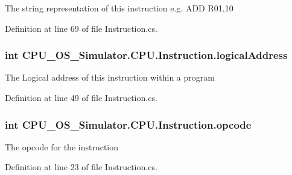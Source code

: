 The string representation of this instruction e.\+g. A\+D\+D R01,10 



Definition at line 69 of file Instruction.\+cs.

\hypertarget{class_c_p_u___o_s___simulator_1_1_c_p_u_1_1_instruction_a6577ac8b9582e24ec928bd4b59093960}{}
\subsubsection[{logical\+Address}]{\setlength{\rightskip}{0pt plus 5cm}int C\+P\+U\+\_\+\+O\+S\+\_\+\+Simulator.\+C\+P\+U.\+Instruction.\+logical\+Address\hspace{0.3cm}{\ttfamily [private]}}\label{class_c_p_u___o_s___simulator_1_1_c_p_u_1_1_instruction_a6577ac8b9582e24ec928bd4b59093960}


The Logical address of this instruction within a program 



Definition at line 49 of file Instruction.\+cs.

\hypertarget{class_c_p_u___o_s___simulator_1_1_c_p_u_1_1_instruction_aa8fa753bf6e1b6ffff7060ec90f930af}{}
\subsubsection[{opcode}]{\setlength{\rightskip}{0pt plus 5cm}int C\+P\+U\+\_\+\+O\+S\+\_\+\+Simulator.\+C\+P\+U.\+Instruction.\+opcode\hspace{0.3cm}{\ttfamily [private]}}\label{class_c_p_u___o_s___simulator_1_1_c_p_u_1_1_instruction_aa8fa753bf6e1b6ffff7060ec90f930af}


The opcode for the instruction 



Definition at line 23 of file Instruction.\+cs.

